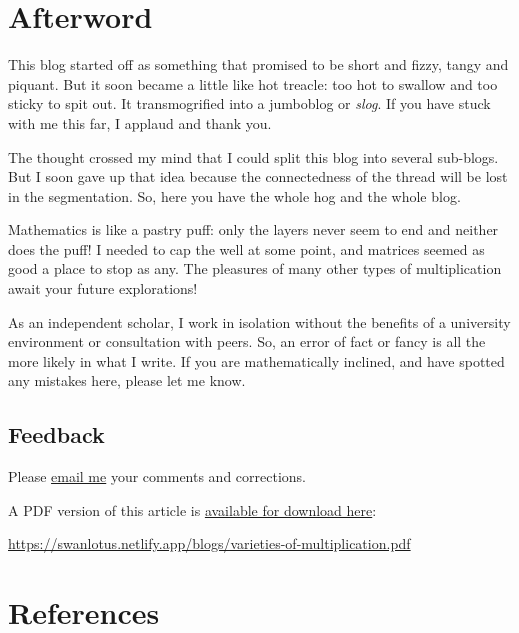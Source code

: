 \documentclass[
  a4paper,
]{article}
\begin{document}
\hypertarget{afterword}{%
\section{Afterword}\label{afterword}}

This blog started off as something that promised to be short and fizzy,
tangy and piquant. But it soon became a little like hot treacle: too hot
to swallow and too sticky to spit out. It transmogrified into a
jumboblog or \emph{slog}. If you have stuck with me this far, I applaud
and thank you.

The thought crossed my mind that I could split this blog into several
sub-blogs. But I soon gave up that idea because the connectedness of the
thread will be lost in the segmentation. So, here you have the whole hog
and the whole blog.

Mathematics is like a pastry puff: only the layers never seem to end and
neither does the puff! I needed to cap the well at some point, and
matrices seemed as good a place to stop as any. The pleasures of many
other types of multiplication await your future explorations!
 \normalfont

As an independent scholar, I work in isolation without the benefits of a
university environment or consultation with peers. So, an error of fact
or fancy is all the more likely in what I write. If you are
mathematically inclined, and have spotted any mistakes here, please let
me know.

\hypertarget{feedback}{%
\subsection{Feedback}\label{feedback}}

Please \href{mailto:feedback.swanlotus@gmail.com}{email me} your
comments and corrections.

\noindent A PDF version of this article is
\href{./varieties-of-multiplication.pdf}{available for download here}:

\begin{small}

\begin{sffamily}

\url{https://swanlotus.netlify.app/blogs/varieties-of-multiplication.pdf}

\end{sffamily}

\end{small}

\hypertarget{bibliography}{%
\section*{References}\label{bibliography}}
\end{document}
